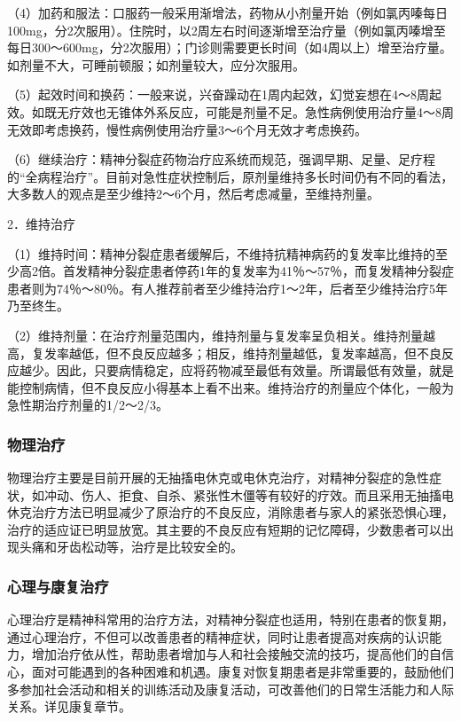 （4）加药和服法：口服药一般采用渐增法，药物从小剂量开始（例如氯丙嗪每日100mg，分2次服用）。住院时，以2周左右时间逐渐增至治疗量（例如氯丙嗪增至每日300～600mg，分2次服用）；门诊则需要更长时间（如4周以上）增至治疗量。如剂量不大，可睡前顿服；如剂量较大，应分次服用。

（5）起效时间和换药：一般来说，兴奋躁动在1周内起效，幻觉妄想在4～8周起效。如既无疗效也无锥体外系反应，可能是剂量不足。急性病例使用治疗量4～8周无效即考虑换药，慢性病例使用治疗量3～6个月无效才考虑换药。

（6）继续治疗：精神分裂症药物治疗应系统而规范，强调早期、足量、足疗程的“全病程治疗”。目前对急性症状控制后，原剂量维持多长时间仍有不同的看法，大多数人的观点是至少维持2～6个月，然后考虑减量，至维持剂量。

2．维持治疗

（1）维持时间：精神分裂症患者缓解后，不维持抗精神病药的复发率比维持的至少高2倍。首发精神分裂症患者停药1年的复发率为41％～57％，而复发精神分裂症患者则为74％～80％。有人推荐前者至少维持治疗1～2年，后者至少维持治疗5年乃至终生。

（2）维持剂量：在治疗剂量范围内，维持剂量与复发率呈负相关。维持剂量越高，复发率越低，但不良反应越多；相反，维持剂量越低，复发率越高，但不良反应越少。因此，只要病情稳定，应将药物减至最低有效量。所谓最低有效量，就是能控制病情，但不良反应小得基本上看不出来。维持治疗的剂量应个体化，一般为急性期治疗剂量的1/2～2/3。

\subsubsection{物理治疗}

物理治疗主要是目前开展的无抽搐电休克或电休克治疗，对精神分裂症的急性症状，如冲动、伤人、拒食、自杀、紧张性木僵等有较好的疗效。而且采用无抽搐电休克治疗方法已明显减少了原治疗的不良反应，消除患者与家人的紧张恐惧心理，治疗的适应证已明显放宽。其主要的不良反应有短期的记忆障碍，少数患者可以出现头痛和牙齿松动等，治疗是比较安全的。

\subsubsection{心理与康复治疗}

心理治疗是精神科常用的治疗方法，对精神分裂症也适用，特别在患者的恢复期，通过心理治疗，不但可以改善患者的精神症状，同时让患者提高对疾病的认识能力，增加治疗依从性，帮助患者增加与人和社会接触交流的技巧，提高他们的自信心，面对可能遇到的各种困难和机遇。康复对恢复期患者是非常重要的，鼓励他们多参加社会活动和相关的训练活动及康复活动，可改善他们的日常生活能力和人际关系。详见康复章节。

